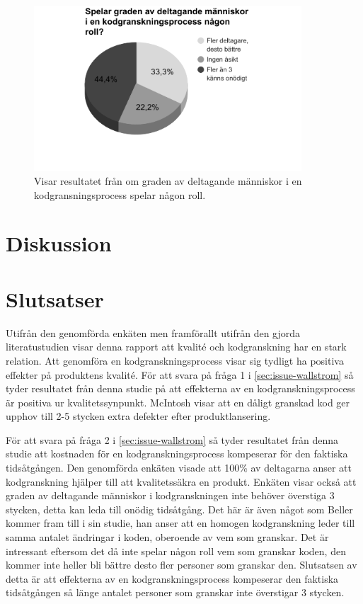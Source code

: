 \begin{figure}[H]
	\includegraphics[width=100mm]{figures/grade_participation.png}
	\caption{Visar resultatet från om graden av deltagande människor i en kodgransningsprocess spelar någon roll.}
	\label{fig:grade_participation}
\end{figure}

\section{Diskussion}
\label{sec:discussion-wallstrom}

\section{Slutsatser}
\label{sec:conclusions-wallstrom}
Utifrån den genomförda enkäten men framförallt utifrån den gjorda literatustudien visar denna rapport att kvalité och kodgranskning har en stark relation. Att genomföra en kodgranskningsprocess visar sig tydligt ha positiva effekter på produktens kvalité. För att svara på fråga 1 i \eqref{sec:issue-wallstrom} så tyder resultatet från denna studie på att effekterna av en kodgranskningsprocess är positiva ur kvalitetssynpunkt. McIntosh \cite{mcintosh2014impact} visar att en dåligt granskad kod ger upphov till 2-5 stycken extra defekter efter produktlansering.

För att svara på fråga 2 i \eqref{sec:issue-wallstrom} så tyder resultatet från denna studie att kostnaden för en kodgranskningsprocess kompeserar för den faktiska tidsåtgången. Den genomförda enkäten visade att 100\% av deltagarna anser att kodgranskning hjälper till att kvalitetssäkra en produkt. Enkäten visar också att graden av deltagande människor i kodgranskningen inte behöver överstiga 3 stycken, detta kan leda till onödig tidsåtgång. Det här är även något som Beller \cite{beller2014modern} kommer fram till i sin studie, han anser att en homogen kodgranskning leder till samma antalet ändringar i koden, oberoende av vem som granskar. Det är intressant eftersom det då inte spelar någon roll vem som granskar koden, den kommer inte heller bli bättre desto fler personer som granskar den. Slutsatsen av detta är att effekterna av en kodgranskningsprocess kompeserar den faktiska tidsåtgången så länge antalet personer som granskar inte överstigar 3 stycken.
 


